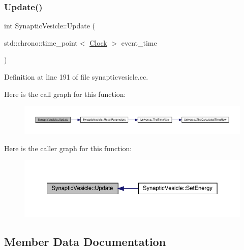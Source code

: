 \subsubsection{\texorpdfstring{Update()}{Update()}}
{\footnotesize\ttfamily int Synaptic\+Vesicle\+::\+Update (\begin{DoxyParamCaption}\item[{std\+::chrono\+::time\+\_\+point$<$ \hyperlink{universe_8h_a0ef8d951d1ca5ab3cfaf7ab4c7a6fd80}{Clock} $>$}]{event\+\_\+time }\end{DoxyParamCaption})}



Definition at line 191 of file synapticvesicle.\+cc.

Here is the call graph for this function\+:
\nopagebreak
\begin{figure}[H]
\begin{center}
\leavevmode
\includegraphics[width=350pt]{class_synaptic_vesicle_a49c8e82147e634c83f7b4c3ef9894e2d_cgraph}
\end{center}
\end{figure}
Here is the caller graph for this function\+:
\nopagebreak
\begin{figure}[H]
\begin{center}
\leavevmode
\includegraphics[width=350pt]{class_synaptic_vesicle_a49c8e82147e634c83f7b4c3ef9894e2d_icgraph}
\end{center}
\end{figure}


\subsection{Member Data Documentation}
\mbox{\label{class_synaptic_vesicle_a6b7fb63806105b89ddad8fd0f56b76f6}} 
